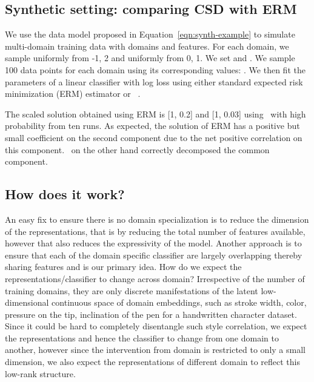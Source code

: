 \documentclass{article}
\begin{document}
\subsection{Synthetic setting: comparing CSD with ERM}
We use the data model proposed in Equation~\ref{eqn:synth-example} to simulate multi-domain training data with  domains and  features. For each domain, we sample  uniformly from -1, 2 and  uniformly from 0, 1. We set  and . We sample 100 data points for each domain using its corresponding values: . We then fit the parameters of a linear classifier with log loss using either standard expected risk minimization (ERM) estimator or \mos\ . 

The scaled solution obtained using ERM is [1, 0.2] and [1, 0.03] using \mos\ with high probability from ten runs. As expected, the solution of ERM has a positive but small coefficient on the second component due to the net positive correlation on this component. \mos\ on the other hand correctly decomposed the common component.

\iffalse
\subsection{How does it work?}
An easy fix to ensure there is no domain specialization is to reduce the dimension of the representations, that is by reducing the total number of features available, however that also reduces the expressivity of the model. Another approach is to ensure that each of the domain specific classifier are largely overlapping thereby sharing features and is our primary idea. 
How do we expect the representations/classifier to change across domain? Irrespective of the number of training domains, they are only discrete manifestations of the latent low-dimensional continuous space of domain embeddings, such as stroke width, color, pressure on the tip, inclination of the pen for a handwritten character dataset. Since it could be hard to completely disentangle such style correlation, we expect the representations and hence the classifier to change from one domain to another, however since the intervention from domain is restricted to only a small dimension, we also expect the representations of different domain to reflect this low-rank structure. 
\end{document}

